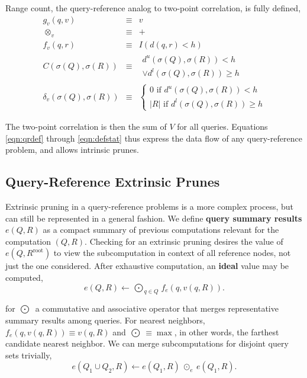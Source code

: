 \documentclass[twoside,leqno,twocolumn]{article}
\newcommand{\union}{\cup}
\newcommand{\summary}{\delta}
\newcommand{\defterm}[1]{{\bf #1}}
\newcommand{\kdroot}[1]{#1^{\text{root}}}
\newcommand{\lo}[1]{#1^{l}}
\newcommand{\up}[1]{#1^{u}}
\newcommand{\distlo}{\lo{d}}
\newcommand{\distup}{\up{d}}
\newcommand{\dist}[2]{d(#1,#2)}
\newcommand{\nameOp}[2]{\mathop{#1\nolimits\!\!_{#2}}}
\newcommand{\nameop}[2]{{\scriptstyle\:}#1_{\!#2}}
\newcommand{\myop}[1]{\nameop{\otimes}{#1}}
\newcommand{\letterqr}{v}
\newcommand{\outqr}{V}
\newcommand{\inqr}{v}
\newcommand{\opqr}{\myop{\letterqr}}
\newcommand{\fqr}{f_{\!\letterqr}}
\newcommand{\gqr}{g_{\!\letterqr}}
\newcommand{\letterqrv}{v}
\newcommand{\deltaqrv}{\summary_{\!\letterqrv}}
\newcommand{\canpruneqrv}{C}%
\newcommand{\lettermu}{e}
\newcommand{\inmu}{e}
\newcommand{\Outopmu}{\nameOp{\bigodot}{\lettermu}}%
\newcommand{\outopmu}{\:\odot_{\!\lettermu}\:}
\newcommand{\fmu}{f_{\!\lettermu}}
\newcommand{\outstat}{\sigma}
\begin{document}
\noindent
Range count, the query-reference analog to two-point correlation, is fully defined,
\begin{eqnarray*}
\gqr(q, \inqr) &\equiv& \inqr
\\
\opqr &\equiv& +
\\
\fqr(q,r) &\equiv& I(\dist{q}{r} < h)
\\
\canpruneqrv(\outstat(Q), \outstat(R))
&\equiv&
\begin{array}{l}\distup(\outstat(Q),\outstat(R)) < h \\ \vee \distlo(\outstat(Q),\outstat(R)) \geq h\end{array}
\\
\deltaqrv(\outstat(Q),\outstat(R)) &\equiv& \left\{ \begin{array}{l} 0 \text{ if } \distup(\outstat(Q),\outstat(R)) < h \\ |R| \text{ if } \distlo(\outstat(Q),\outstat(R)) \geq h \end{array}\right.
\end{eqnarray*}

\noindent
The two-point correlation is then the sum of $\outqr$ for all queries.
Equations \ref{eqn:qrdef} through \ref{eqn:defstat} thus express the data flow of any query-reference problem, and allows intrinsic prunes.

\subsection{Query-Reference Extrinsic Prunes}

Extrinsic pruning in a query-reference problems is a more complex process, but can still be represented in a general fashion.
We define \defterm{query summary results} $\inmu(Q, R)$ as a compact summary of previous computations relevant for the computation $(Q,R)$.
Checking for an extrinsic pruning desires the value of $\inmu(Q, \kdroot{R})$ to view the subcomputation in context of all reference nodes, not just the one considered.
After exhaustive computation, an \defterm{ideal} value may be computed,
\begin{equation*}
\inmu(Q, R) \gets \Outopmu_{q \in Q} \fmu(q, \inqr(q, R)).
\end{equation*}

\noindent for $\Outopmu$ a commutative and associative operator that merges representative summary results among queries.
For nearest neighbors, $\fmu(q, \inqr(q, R)) \equiv \inqr(q, R)$ and $\Outopmu \equiv \max$, in other words, the farthest candidate nearest neighbor.
We can merge subcomputations for disjoint query sets trivially,
\begin{equation}
\inmu(Q_1 \union Q_2, R) \gets \inmu(Q_1, R) \outopmu \inmu(Q_1, R).
\label{eqn:muchild}
\end{equation}
\end{document}
